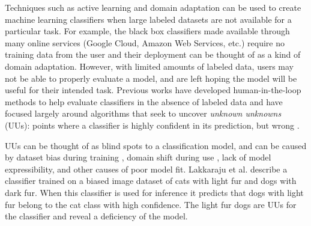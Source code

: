 \documentclass[10pt, conference]{IEEEtran}
\begin{document}
Techniques such as active learning \cite{Settles2010} and domain adaptation \cite{Patel2014} can be used to create machine learning classifiers when large labeled datasets are not available for a particular task. For example, the black box classifiers made available through many online services (Google Cloud, Amazon Web Services, etc.) require no training data from the user and their deployment can be thought of as a kind of domain adaptation.  However, with limited amounts of labeled data, users may not be able to properly evaluate a model, and are left hoping the model will be useful for their intended task. Previous works have developed human-in-the-loop methods to help evaluate classifiers in the absence of labeled data and have focused largely around algorithms that seek to uncover \textit{unknown unknowns} (UUs): points where a classifier is highly confident in its prediction, but wrong \cite{Attenberg2015}. 

UUs can be thought of as blind spots to a classification model, and can be caused by dataset bias during training \cite{stock2017convnets}, domain shift during use \cite{sugiyama2017dataset}, lack of model expressibility, and other causes of poor model fit. Lakkaraju et al. \cite{Lakkaraju2016} describe a classifier trained on a biased image dataset of cats with light fur and dogs with dark fur. When this classifier is used for inference it predicts that dogs with light fur belong to the cat class with high confidence.  The light fur dogs are UUs for the classifier and reveal a deficiency of the model.  


\end{document}
